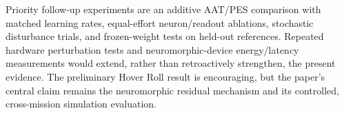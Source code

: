 \documentclass[letterpaper,10pt,conference]{IEEEtran}
\begin{document}
Priority follow-up experiments are an additive AAT/PES comparison with
matched learning rates, equal-effort neuron/readout ablations, stochastic
disturbance trials, and frozen-weight tests on held-out references.
Repeated hardware perturbation tests and neuromorphic-device energy/latency
measurements would extend, rather than retroactively strengthen, the
present evidence. The preliminary Hover Roll result is encouraging, but
the paper's central claim remains the neuromorphic residual mechanism and
its controlled, cross-mission simulation evaluation.



\end{document}

